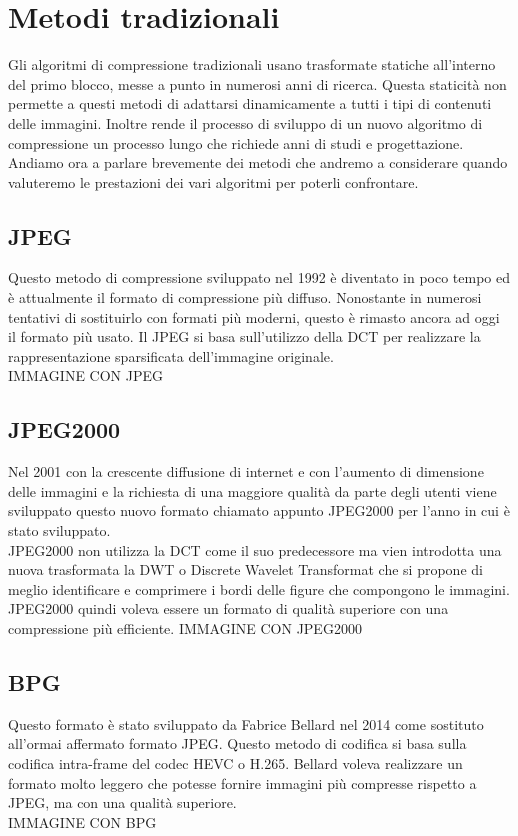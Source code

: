 \chapter{Metodi tradizionali}
Gli algoritmi di compressione tradizionali usano trasformate statiche all’interno del primo blocco, messe a punto in numerosi anni di ricerca. Questa staticità non permette a questi metodi di adattarsi dinamicamente a tutti i tipi di contenuti delle immagini. \cite{cheng2018deep}  Inoltre rende il processo di sviluppo di un nuovo algoritmo di compressione un processo lungo che richiede anni di studi e progettazione. \cite{ cheng2018deep}
Andiamo ora a parlare brevemente dei metodi che andremo a considerare quando valuteremo le prestazioni dei vari algoritmi per poterli confrontare.

\section{JPEG}
Questo metodo di compressione sviluppato nel 1992 è diventato in poco tempo ed è attualmente il formato di compressione più diffuso. Nonostante in numerosi tentativi di sostituirlo con formati più moderni, questo è rimasto ancora ad oggi il formato più usato. Il JPEG si basa sull’utilizzo della DCT per realizzare la rappresentazione sparsificata dell’immagine originale. \cite{ 125072} \\
\newline
IMMAGINE CON JPEG

\section{JPEG2000}
Nel 2001 con la crescente diffusione di internet e con l’aumento di dimensione delle immagini e la richiesta di una maggiore qualità da parte degli utenti viene sviluppato questo nuovo formato chiamato appunto JPEG2000 per l’anno in cui è stato sviluppato.\\
JPEG2000 non utilizza la DCT come il suo predecessore ma vien introdotta una nuova trasformata la DWT o Discrete Wavelet Transformat che si propone di meglio identificare e comprimere i bordi delle figure che compongono le immagini. JPEG2000 quindi voleva essere un formato di qualità superiore con una compressione più efficiente. \cite{952804}
\newline
IMMAGINE CON JPEG2000

\section{BPG}
Questo formato è stato sviluppato da Fabrice Bellard nel 2014 come sostituto all’ormai affermato formato JPEG. Questo metodo di codifica si basa sulla codifica intra-frame del codec HEVC o H.265. \cite{BPGImageformat} Bellard voleva realizzare un formato molto leggero che potesse fornire immagini più compresse rispetto a JPEG, ma con una qualità superiore.\\
\newline
IMMAGINE CON BPG

